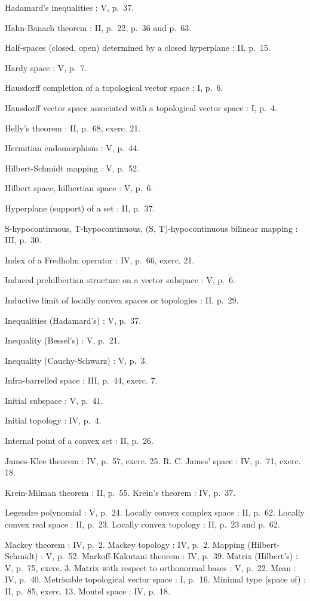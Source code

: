 Hadamard's inequalities : V, p.~37.

Hahn-Banach theorem : II, p.~22, p.~36 and p.~63.

Half-spaces (closed, open) determined by a closed hyperplane : II, p.~15.

Hardy space : V, p.~7.

Hausdorff completion of a topological vector space : I, p.~6.

Hausdorff vector space associated with a topological vector space : I, p.~4.

Helly's theorem : II, p.~68, exerc. 21.

Hermitian endomorphism : V, p.~44.

Hilbert-Schmidt mapping : V, p.~52.

Hilbert space, hilbertian space : V, p.~6.

Hyperplane (support) of a set : II, p.~37.

S-hypocontinuous, T-hypocontinuous, (S, T)-hypocontinuous bilinear mapping : III, p.~30.

Index of a Fredholm operator : IV, p.~66, exerc. 21.

Induced prehilbertian structure on a vector subspace : V, p.~6.

Inductive limit of locally convex spaces or topologies : II, p.~29.

Inequalities (Hadamard's) : V, p.~37.

Inequality (Bessel's) : V, p.~21.

Inequality (Cauchy-Schwarz) : V, p.~3.

Infra-barrelled space : III, p.~44, exerc. 7.

Initial subspace : V, p.~41.

Initial topology : IV, p.~4.

Internal point of a convex set : II, p.~26.

James-Klee theorem : IV, p.~57, exerc. 25. R. C. James' space : IV, p.~71, exerc. 18.

Krein-Milman theorem : II, p.~55. Krein's theorem : IV, p.~37.

Legendre polynomial : V, p.~24. Locally convex complex space : II, p.~62. Locally convex real space : II, p.~23. Locally convex topology : II, p.~23 and p.~62.

Mackey theorem : IV, p.~2. Mackey topology : IV, p.~2. Mapping (Hilbert-Schmidt) : V, p.~52. Markoff-Kakutani theorem : IV, p.~39. Matrix (Hilbert's) : V, p.~75, exerc. 3. Matrix with respect to orthonormal bases : V, p.~22. Mean : IV, p.~40. Metrisable topological vector space : I, p.~16. Minimal type (space of) : II, p.~85, exerc. 13. Montel space : IV, p.~18.

